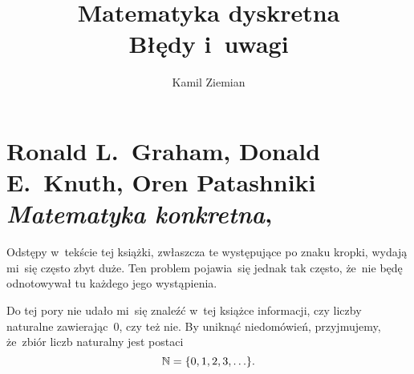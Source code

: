 \documentclass[a4paper,11pt]{article}
\title{Matematyka dyskretna \\
  {\Large Błędy i~uwagi}}
\author{Kamil Ziemian}
\numberwithin{equation}{section}
\begin{document}





\maketitle




















\section{Ronald L.~Graham, Donald E.~Knuth, Oren Patashniki
  \textit{Matematyka konkretna},
  \parencite{Graham-Knuth-Patashnik-Matematyka-Konkretna-Pub-2012}}

\label{sec:Graham-Knuth-Patashnik-Matematyka-konkretna}



\vspace{0em}


\noindent
Odstępy w~tekście tej książki, zwłaszcza te występujące po znaku kropki,
wydają mi~się często zbyt duże. Ten problem pojawia~się jednak tak często,
że~nie będę odnotowywał tu każdego jego wystąpienia.

\VerSpaceFour





\noindent
Do tej pory nie udało mi~się znaleźć w~tej książce informacji, czy liczby
naturalne zawierając~$0$, czy też nie. By uniknąć niedomówień, przyjmujemy,
że~zbiór liczb naturalny jest postaci
\begin{equation}
  \label{eq:1111}
  \mathbb{N} = \{ 0, 1, 2, 3, \ldots \}.
\end{equation}
\end{document}
